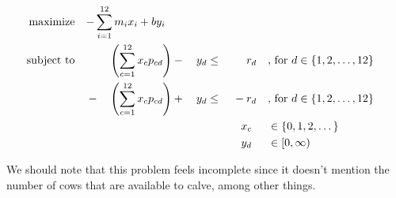 \documentclass[12pt,letterpaper]{article}
\begin{document}
\begin{enumerate}
      \begin{alignat*}{5}
        \text{maximize}   \quad \mathrlap{-\sum_{i = 1}^{12}m_i x_i + b y_i}  \\
        \text{subject to} \quad &       &\left(\sum_{c = 1}^{12} x_c p_{cd}\right) & {}-{} & y_d & {}\leq{} &       & r_d            && \text{, for } d \in \{1, 2, \dots, 12\} \\
                                & {}-{} &\left(\sum_{c = 1}^{12} x_c p_{cd}\right) & {}+{} & y_d & {}\leq{} & {}-{} & r_d            && \text{, for } d \in \{1, 2, \dots, 12\} \\
                                &       &                                          &   &     &          &       & \mathclap{x_c} && \in  \{0, 1, 2, \dots\} \\
                                &       &                                          &   &     &          &       & \mathclap{y_d} && \in  [0, \infty) \\
      \end{alignat*}

      We should note that this problem feels incomplete since it doesn't mention the number of cows that are available to calve, among other things.
  \end{enumerate}
\end{document}
